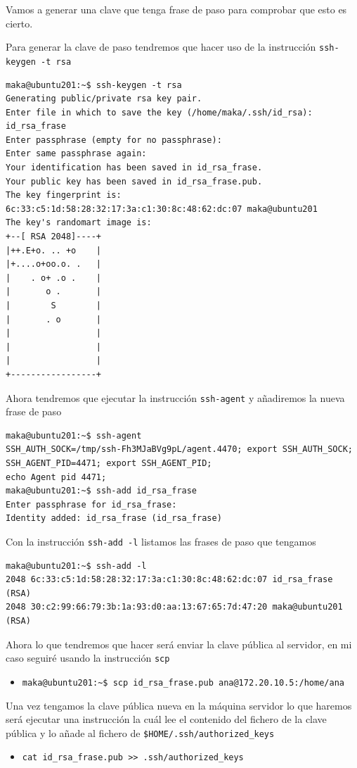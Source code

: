 \documentclass[11pt]{article}
\begin{document}
Vamos a generar una clave que tenga frase de paso para comprobar que esto es cierto.

Para generar la clave de paso tendremos que hacer uso de la instrucción \texttt{ssh-keygen -t rsa}
\begin{verbatim}
maka@ubuntu201:~$ ssh-keygen -t rsa
Generating public/private rsa key pair.
Enter file in which to save the key (/home/maka/.ssh/id_rsa): id_rsa_frase
Enter passphrase (empty for no passphrase): 
Enter same passphrase again: 
Your identification has been saved in id_rsa_frase.
Your public key has been saved in id_rsa_frase.pub.
The key fingerprint is:
6c:33:c5:1d:58:28:32:17:3a:c1:30:8c:48:62:dc:07 maka@ubuntu201
The key's randomart image is:
+--[ RSA 2048]----+
|++.E+o. .. +o    |
|+....o+oo.o. .   |
|    . o+ .o .    |
|       o .       |
|        S        |
|       . o       |
|                 |
|                 |
|                 |
+-----------------+
\end{verbatim}

Ahora tendremos que ejecutar la instrucción \texttt{ssh-agent} y añadiremos la nueva frase de paso
\begin{verbatim}
maka@ubuntu201:~$ ssh-agent 
SSH_AUTH_SOCK=/tmp/ssh-Fh3MJaBVg9pL/agent.4470; export SSH_AUTH_SOCK;
SSH_AGENT_PID=4471; export SSH_AGENT_PID;
echo Agent pid 4471;
maka@ubuntu201:~$ ssh-add id_rsa_frase
Enter passphrase for id_rsa_frase: 
Identity added: id_rsa_frase (id_rsa_frase)
\end{verbatim}

Con la instrucción \texttt{ssh-add -l} listamos las frases de paso que tengamos
\begin{verbatim}
maka@ubuntu201:~$ ssh-add -l
2048 6c:33:c5:1d:58:28:32:17:3a:c1:30:8c:48:62:dc:07 id_rsa_frase (RSA)
2048 30:c2:99:66:79:3b:1a:93:d0:aa:13:67:65:7d:47:20 maka@ubuntu201 (RSA)
\end{verbatim}

Ahora lo que tendremos que hacer será enviar la clave pública al servidor, en mi caso seguiré usando la instrucción \texttt{scp}
\begin{itemize}
\item \texttt{maka@ubuntu201:\textasciitilde{}\$ scp id\_rsa\_frase.pub ana@172.20.10.5:/home/ana}
\end{itemize}

Una vez tengamos la clave pública nueva en la máquina servidor lo que haremos será ejecutar una instrucción la cuál lee el contenido del fichero de la clave pública y lo añade al fichero de
\texttt{\$HOME/.ssh/authorized\_keys}
\begin{itemize}
\item \texttt{cat id\_rsa\_frase.pub >{}>{} .ssh/authorized\_keys}
\end{itemize}
\end{document}
